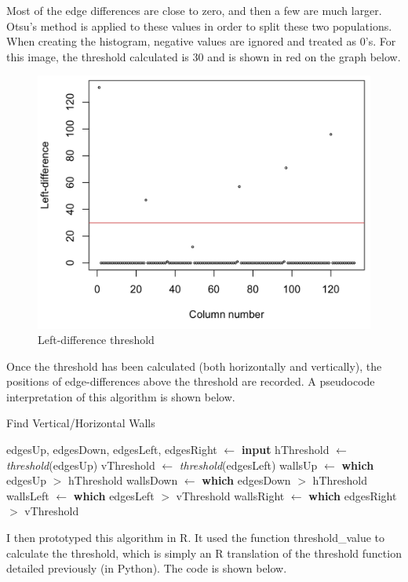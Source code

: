 \documentclass[titlepage]{article}
\begin{document}
Most of the edge differences are close to zero, and then a few are much larger. Otsu's method is applied to these values in order to split these two populations. When creating the histogram, negative values are ignored and treated as 0's. For this image, the threshold calculated is 30 and is shown in red on the graph below.

\begin{figure}[H]
  \centering
  \includegraphics[width=12cm]{edgethresh.png}
  \caption{Left-difference threshold}
  \label{fig:dijk}
\end{figure}

Once the threshold has been calculated (both horizontally and vertically), the positions of edge-differences above the threshold are recorded. A pseudocode interpretation of this algorithm is shown below.

\begin{algorithm}[H]
\caption{Find Vertical/Horizontal Walls}
\begin{algorithmic}[1]
	\State edgesUp, edgesDown, edgesLeft, edgesRight  $\gets$ \textbf{input}
    	\State hThreshold $\gets$ \textit{threshold}(edgesUp)
    	\State vThreshold $\gets$ \textit{threshold}(edgesLeft)
	\State wallsUp $\gets$ \textbf{which} edgesUp $>$ hThreshold
	\State wallsDown $\gets$ \textbf{which} edgesDown $>$ hThreshold
	\State wallsLeft $\gets$ \textbf{which} edgesLeft $>$ vThreshold
	\State wallsRight $\gets$ \textbf{which} edgesRight $>$ vThreshold
\end{algorithmic}
\end{algorithm}

I then prototyped this algorithm in R. It used the function threshold\_value to calculate the threshold, which is simply an R translation of the threshold function detailed previously (in Python). The code is shown below.
\end{document}

